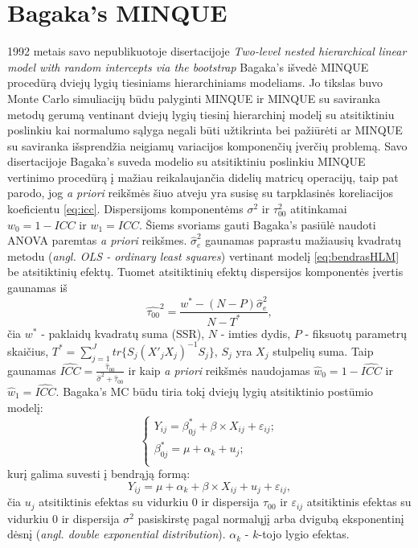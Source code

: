 \documentclass[12pt,a4paper]{article}
\begin{document}
\section{Bagaka's MINQUE}
1992 metais savo nepublikuotoje disertacijoje \textit{Two-level nested hierarchical linear model with random intercepts via the bootstrap}\cite{bagaka} Bagaka's išvedė MINQUE procedūrą dviejų lygių tiesiniams hierarchiniams modeliams. Jo tikslas buvo Monte Carlo simuliacijų būdu palyginti MINQUE ir MINQUE su saviranka metodų gerumą ventinant dviejų lygių tiesinį hierarchinį modelį su atsitiktiniu poslinkiu kai normalumo sąlyga negali būti užtikrinta bei pažiūrėti ar MINQUE su saviranka išsprendžia neigiamų variacijos komponenčių įverčių problemą. Savo disertacijoje Bagaka's suveda modelio su atsitiktiniu poslinkiu MINQUE vertinimo procedūrą į mažiau reikalaujančia didelių matricų operacijų, taip pat parodo, jog \textit{a priori} reikšmės šiuo atveju yra susisę su tarpklasinės koreliacijos koeficientu \ref{eq:icc}. Dispersijoms komponentėms $\sigma^2$ ir $\tau_{00}^2$ atitinkamai $w_0=1-ICC$ ir $w_1=ICC$.
\indent Šiems svoriams gauti Bagaka's pasiūlė naudoti ANOVA paremtas \textit{a priori} reikšmes. $\hat{\sigma}^2_{e}$ gaunamas paprastu mažiausių kvadratų metodu (\textit{angl. OLS - ordinary least squares}) vertinant modelį \ref{eq:bendrasHLM} be atsitiktinių efektų. Tuomet atsitiktinių efektų dispersijos komponentės įvertis gaunamas iš
\[
\hat{\tau_{00}}^2=\frac{w^*-(N-P)\hat{\sigma}_e^2}{N-T^*},
\]
čia $w^*$ - paklaidų kvadratų suma (SSR), $N$ - imties dydis, $P$ - fiksuotų parametrų skaičius, $T^*=\sum_{j=1}^J tr\{S_j(X'_jX_j)^{-1}S_j\}$, $S_j$ yra $X_j$ stulpelių suma. Taip gaunamas $\widehat{ICC} = \frac{\hat{\tau}_{00}}{\hat{\sigma}^2+\hat{\tau}_{00}}$ ir kaip \textit{a priori} reikšmės naudojamas $\hat{w}_0=1-\widehat{ICC}$ ir $\hat{w}_1=\widehat{ICC}$.
\indent Bagaka's MC būdu tiria tokį dviejų lygių atsitiktinio postūmio modelį:
\begin{equation}\label{eq:beqa}
\left\{
\begin{array}{l}
Y_{ij} = \beta^*_{0j}+ \beta \times X_{ij}+\varepsilon_{ij}; \\
\beta^*_{0j} = \mu+\alpha_k+u_{j};\\
\end{array} \right. 
\end{equation}
kurį galima suvesti į bendrąją formą:
\begin{equation}\label{eq:beq}
Y_{ij}=\mu+\alpha_k+\beta\times X_{ij}+u_j+\varepsilon_{ij}, 
\end{equation}
čia $u_j$ atsitiktinis efektas su vidurkiu 0 ir dispersija $\tau_00$ ir $\varepsilon_{ij}$ atsitiktinis efektas su vidurkiu 0 ir dispersija $\sigma^2$ pasiskirstę pagal normalųjį arba dvigubą eksponentinį dėsnį (\textit{angl. double exponential distribution}). $\alpha_k$ - $k$-tojo lygio efektas.
\end{document}
